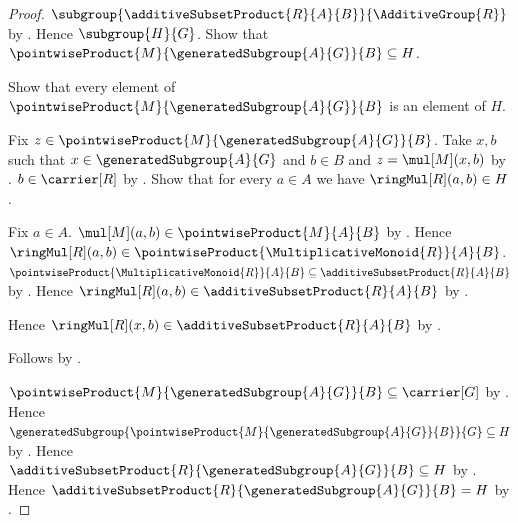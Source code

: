 \begin{proof}
    $\subgroup{\additiveSubsetProduct{R}{A}{B}}{\AdditiveGroup{R}}$ by
        .
    Hence $\subgroup{H}{G}$.
    Show that
        $\pointwiseProduct{M}{\generatedSubgroup{A}{G}}{B}\subseteq H$.
    \begin{subproof}
        Show that every element of
            $\pointwiseProduct{M}{\generatedSubgroup{A}{G}}{B}$ is an
            element of $H$.
        \begin{subproof}
            Fix $z\in
                \pointwiseProduct{M}{\generatedSubgroup{A}{G}}{B}$.
            Take $x,b$ such that $x\in\generatedSubgroup{A}{G}$ and
                $b\in B$ and $z=\mul[M](x,b)$ by
                .
            $b\in\carrier[R]$ by .
            Show that for every $a\in A$ we have $\ringMul[R](a,b)\in H$.
            \begin{subproof}
                Fix $a\in A$.
                $\mul[M](a,b)\in\pointwiseProduct{M}{A}{B}$ by
                    .
                Hence $\ringMul[R](a,b)\in
                    \pointwiseProduct{\MultiplicativeMonoid{R}}{A}{B}$.
                $\pointwiseProduct{\MultiplicativeMonoid{R}}{A}{B}
                    \subseteq\additiveSubsetProduct{R}{A}{B}$ by
                    .
                Hence $\ringMul[R](a,b)\in
                    \additiveSubsetProduct{R}{A}{B}$ by
                    .
            \end{subproof}
            Hence $\ringMul[R](x,b)\in
                \additiveSubsetProduct{R}{A}{B}$ by
                .
        \end{subproof}
        Follows by .
    \end{subproof}
    $\pointwiseProduct{M}{\generatedSubgroup{A}{G}}{B}
        \subseteq\carrier[G]$ by .
    Hence $\generatedSubgroup{
        \pointwiseProduct{M}{\generatedSubgroup{A}{G}}{B}}{G}
        \subseteq H$ by .
    Hence $\additiveSubsetProduct{R}{\generatedSubgroup{A}{G}}{B}
        \subseteq H$ by .
    Hence $\additiveSubsetProduct{R}{\generatedSubgroup{A}{G}}{B}=H$ by
        .
\end{proof}

